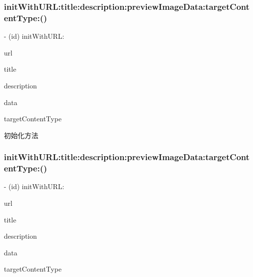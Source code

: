 \subsubsection{\texorpdfstring{init\+With\+U\+R\+L\+:title\+:description\+:preview\+Image\+Data\+:target\+Content\+Type\+:()}{initWithURL:title:description:previewImageData:targetContentType:()}\hspace{0.1cm}{\footnotesize\ttfamily [1/2]}}
{\footnotesize\ttfamily -\/ (id) init\+With\+U\+R\+L\+: \begin{DoxyParamCaption}\item[{(N\+S\+U\+RL $\ast$)}]{url }\item[{title:(N\+S\+String $\ast$)}]{title }\item[{description:(N\+S\+String $\ast$)}]{description }\item[{previewImageData:(N\+S\+Data $\ast$)}]{data }\item[{targetContentType:(Q\+Q\+Api\+U\+R\+L\+Target\+Type)}]{target\+Content\+Type }\end{DoxyParamCaption}}

初始化方法 \mbox{\label{interface_q_q_api_u_r_l_object_ac9b4f31bdacdfbc736c0fa30093de457}} 
\subsubsection{\texorpdfstring{init\+With\+U\+R\+L\+:title\+:description\+:preview\+Image\+Data\+:target\+Content\+Type\+:()}{initWithURL:title:description:previewImageData:targetContentType:()}\hspace{0.1cm}{\footnotesize\ttfamily [2/2]}}
{\footnotesize\ttfamily -\/ (id) init\+With\+U\+R\+L\+: \begin{DoxyParamCaption}\item[{(N\+S\+U\+RL $\ast$)}]{url }\item[{title:(N\+S\+String $\ast$)}]{title }\item[{description:(N\+S\+String $\ast$)}]{description }\item[{previewImageData:(N\+S\+Data $\ast$)}]{data }\item[{targetContentType:(Q\+Q\+Api\+U\+R\+L\+Target\+Type)}]{target\+Content\+Type }\end{DoxyParamCaption}}

